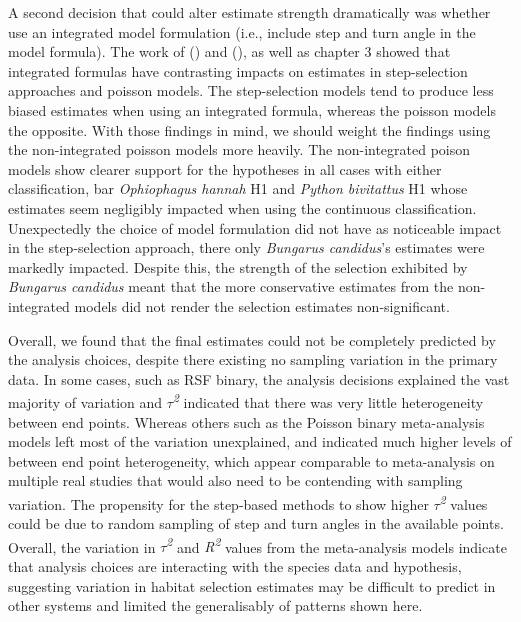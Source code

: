 \documentclass[10pt,a4paper]{article}
\begin{document}
A second decision that could alter estimate strength dramatically was whether use an integrated model formulation (i.e., include step and turn angle in the model formula).
The work of () and (), as well as chapter 3 showed that integrated formulas have contrasting impacts on estimates in step-selection approaches and poisson models.
The step-selection models tend to produce less biased estimates when using an integrated formula, whereas the poisson models the opposite.
With those findings in mind, we should weight the findings using the non-integrated poisson models more heavily.
The non-integrated poison models show clearer support for the hypotheses in all cases with either classification, bar \emph{Ophiophagus hannah} H1 and \emph{Python bivitattus} H1 whose estimates seem negligibly impacted when using the continuous classification.
Unexpectedly the choice of model formulation did not have as noticeable impact in the step-selection approach, there only \emph{Bungarus candidus}'s estimates were markedly impacted.
Despite this, the strength of the selection exhibited by \emph{Bungarus candidus} meant that the more conservative estimates from the non-integrated models did not render the selection estimates non-significant.

Overall, we found that the final estimates could not be completely predicted by the analysis choices, despite there existing no sampling variation in the primary data.
In some cases, such as RSF binary, the analysis decisions explained the vast majority of variation and \emph{\(\tau\)\textsuperscript{2}} indicated that there was very little heterogeneity between end points.
Whereas others such as the Poisson binary meta-analysis models left most of the variation unexplained, and indicated much higher levels of between end point heterogeneity, which appear comparable to meta-analysis on multiple real studies that would also need to be contending with sampling variation.
The propensity for the step-based methods to show higher \emph{\(\tau\)\textsuperscript{2}} values could be due to random sampling of step and turn angles in the available points.
Overall, the variation in \emph{\(\tau\)\textsuperscript{2}} and \emph{R\textsuperscript{2}} values from the meta-analysis models indicate that analysis choices are interacting with the species data and hypothesis, suggesting variation in habitat selection estimates may be difficult to predict in other systems and limited the generalisably of patterns shown here.
\end{document}
